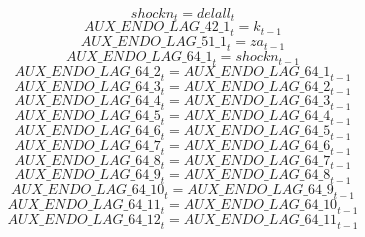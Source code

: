 \begin{dmath}
{shockn}_{t}={delall}_{t}
\end{dmath}
\begin{dmath}
{AUX\_ENDO\_LAG\_42\_1}_{t}={k}_{t-1}
\end{dmath}
\begin{dmath}
{AUX\_ENDO\_LAG\_51\_1}_{t}={za}_{t-1}
\end{dmath}
\begin{dmath}
{AUX\_ENDO\_LAG\_64\_1}_{t}={shockn}_{t-1}
\end{dmath}
\begin{dmath}
{AUX\_ENDO\_LAG\_64\_2}_{t}={AUX\_ENDO\_LAG\_64\_1}_{t-1}
\end{dmath}
\begin{dmath}
{AUX\_ENDO\_LAG\_64\_3}_{t}={AUX\_ENDO\_LAG\_64\_2}_{t-1}
\end{dmath}
\begin{dmath}
{AUX\_ENDO\_LAG\_64\_4}_{t}={AUX\_ENDO\_LAG\_64\_3}_{t-1}
\end{dmath}
\begin{dmath}
{AUX\_ENDO\_LAG\_64\_5}_{t}={AUX\_ENDO\_LAG\_64\_4}_{t-1}
\end{dmath}
\begin{dmath}
{AUX\_ENDO\_LAG\_64\_6}_{t}={AUX\_ENDO\_LAG\_64\_5}_{t-1}
\end{dmath}
\begin{dmath}
{AUX\_ENDO\_LAG\_64\_7}_{t}={AUX\_ENDO\_LAG\_64\_6}_{t-1}
\end{dmath}
\begin{dmath}
{AUX\_ENDO\_LAG\_64\_8}_{t}={AUX\_ENDO\_LAG\_64\_7}_{t-1}
\end{dmath}
\begin{dmath}
{AUX\_ENDO\_LAG\_64\_9}_{t}={AUX\_ENDO\_LAG\_64\_8}_{t-1}
\end{dmath}
\begin{dmath}
{AUX\_ENDO\_LAG\_64\_10}_{t}={AUX\_ENDO\_LAG\_64\_9}_{t-1}
\end{dmath}
\begin{dmath}
{AUX\_ENDO\_LAG\_64\_11}_{t}={AUX\_ENDO\_LAG\_64\_10}_{t-1}
\end{dmath}
\begin{dmath}
{AUX\_ENDO\_LAG\_64\_12}_{t}={AUX\_ENDO\_LAG\_64\_11}_{t-1}
\end{dmath}
